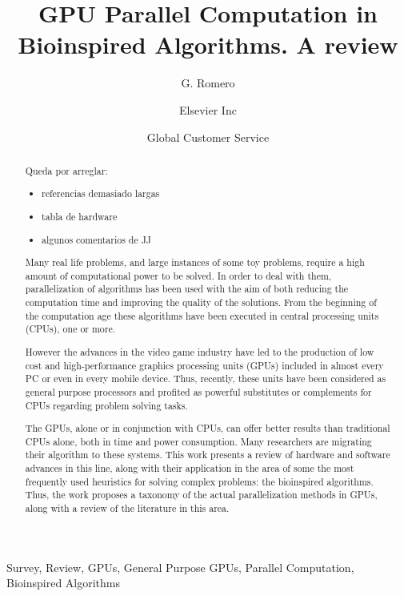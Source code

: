 \documentclass[review]{elsarticle}
\begin{document}
\begin{frontmatter}


\title{GPU Parallel Computation in Bioinspired Algorithms. A review}

\author{G. Romero}
\address{University of Granada}

\author[mymainaddress,mysecondaryaddress]{Elsevier Inc}

\author[mysecondaryaddress]{Global Customer Service}

\address[mymainaddress]{1600 John F Kennedy Boulevard, Philadelphia}
\address[mysecondaryaddress]{360 Park Avenue South, New York}

\begin{abstract}
Queda por arreglar:
\begin{itemize}
\item referencias demasiado largas
\item tabla de hardware
\item algunos comentarios de JJ
\end{itemize}

Many real life problems, and large instances of some toy problems, require a high amount of computational power to be solved. In order to deal with them, parallelization of algorithms has been used with the aim of both reducing the computation time and improving the quality of the solutions. From the beginning of the computation age these algorithms have been executed in central processing units (CPUs), one or more.

However the advances in the video game industry have led to the production of low cost and high-performance graphics processing units (GPUs) included in almost every PC or even in every mobile device. Thus, recently, these units have been considered as general purpose processors and profited as powerful substitutes or complements for CPUs regarding problem solving tasks.

The GPUs, alone or in conjunction with CPUs, can offer better results than traditional CPUs alone, both in time and power consumption. Many researchers are migrating their algorithm to these systems. This work presents a review of hardware and software advances in this line, along with their application in the area of some the most frequently used heuristics for solving complex problems: the bioinspired algorithms. Thus, the work proposes a taxonomy of the actual parallelization methods in GPUs, along with a review of the literature in this area.
\end{abstract}

\begin{keyword}
Survey, Review, GPUs, General Purpose GPUs, Parallel Computation, Bioinspired Algorithms
\end{keyword}

\end{frontmatter}
\end{document}
